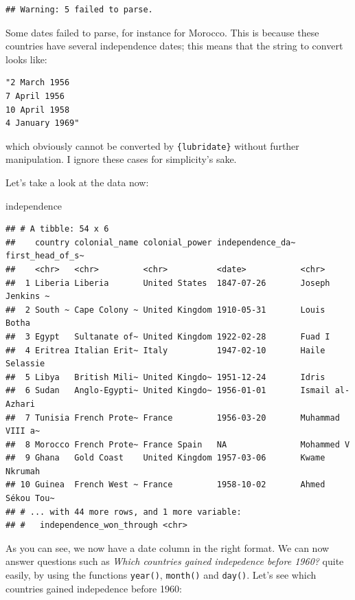 \documentclass[]{gitbook}
\newenvironment{Shaded}{\begin{snugshade}}{\end{snugshade}}
\newcommand{\NormalTok}[1]{#1}
\theoremstyle{definition}
\theoremstyle{definition}
\theoremstyle{definition}
\theoremstyle{remark}
\begin{document}
\begin{verbatim}
## Warning: 5 failed to parse.
\end{verbatim}

Some dates failed to parse, for instance for Morocco. This is because
these countries have several independence dates; this means that the
string to convert looks like:

\begin{verbatim}
"2 March 1956
7 April 1956
10 April 1958
4 January 1969"
\end{verbatim}

which obviously cannot be converted by \texttt{\{lubridate\}} without
further manipulation. I ignore these cases for simplicity's sake.

Let's take a look at the data now:

\begin{Shaded}
\begin{Highlighting}[]
\NormalTok{independence}
\end{Highlighting}
\end{Shaded}

\begin{verbatim}
## # A tibble: 54 x 6
##    country colonial_name colonial_power independence_da~ first_head_of_s~
##    <chr>   <chr>         <chr>          <date>           <chr>           
##  1 Liberia Liberia       United States  1847-07-26       Joseph Jenkins ~
##  2 South ~ Cape Colony ~ United Kingdom 1910-05-31       Louis Botha     
##  3 Egypt   Sultanate of~ United Kingdom 1922-02-28       Fuad I          
##  4 Eritrea Italian Erit~ Italy          1947-02-10       Haile Selassie  
##  5 Libya   British Mili~ United Kingdo~ 1951-12-24       Idris           
##  6 Sudan   Anglo-Egypti~ United Kingdo~ 1956-01-01       Ismail al-Azhari
##  7 Tunisia French Prote~ France         1956-03-20       Muhammad VIII a~
##  8 Morocco French Prote~ France Spain   NA               Mohammed V      
##  9 Ghana   Gold Coast    United Kingdom 1957-03-06       Kwame Nkrumah   
## 10 Guinea  French West ~ France         1958-10-02       Ahmed Sékou Tou~
## # ... with 44 more rows, and 1 more variable:
## #   independence_won_through <chr>
\end{verbatim}

As you can see, we now have a date column in the right format. We can
now answer questions such as \emph{Which countries gained indepedence
before 1960?} quite easily, by using the functions \texttt{year()},
\texttt{month()} and \texttt{day()}. Let's see which countries gained
indepedence before 1960:
\end{document}

